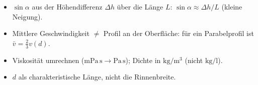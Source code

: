 \begin{achtung}
\begin{itemize}
  \item $\sin\alpha$ aus der Höhendifferenz $\Delta h$ über die Länge $L$:
       $\sin\alpha\approx \Delta h/L$ (kleine Neigung).
  \item Mittlere Geschwindigkeit $\neq$ Profil an der Oberfläche: für ein
       Parabelprofil ist $\bar v=\frac23 v(d)$.
  \item Viskosität umrechnen ($\mathrm{mPa\,s}\to\mathrm{Pa\,s}$); Dichte in
       $\mathrm{kg/m^3}$ (nicht $\mathrm{kg/l}$).
  \item $d$ als charakteristische Länge, nicht die Rinnenbreite.
\end{itemize}
\end{achtung}
